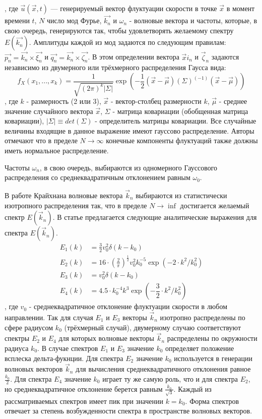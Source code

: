 \noindent
, где $\vec{u} (\vec{x}, t)$ — генерируемый вектор флуктуации скорости в точке $\vec{x}$ в момент времени $t$, $N$ число мод Фурье, $\vec{k_n}$ и $\omega_n$ - волновые вектора и частоты, которые, в свою очередь, генерируются так, чтобы удовлетворять желаемому спектру $E(\vec{k_n})$. Амплитуды каждой из мод задаются по следующим правилам: $\vec{p_n} = \vec{k_n} \times \vec{\xi_n}$ и $\vec{q_n} = \vec{k_n} \times \vec{\zeta_n}$. В этом определении вектора $\vec xi_n$ и $\vec \zeta_n$ задаются независимо из двумерного или трёхмерного распределения Гаусса вида:  
\begin{equation}
  \label{eq:gauss_distr1}
  f_X (x_1, ..., x_k) = \frac{1}{\sqrt{(2 \pi)^k \left|\Sigma\right|}} \exp{(- \frac{1}{2} (\vec{x} - \vec{\mu}) (\Sigma)^(-1) (\vec{x} - \vec{\mu}) )} 
\end{equation}
\noindent
, где $k$ - размерность (2 или 3), $\vec x$ - вектор-столбец размерности $k$, $\vec \mu$ - среднее значение случайного вектора $\vec x$, $\Sigma$ - матрица ковариации (обобщенная матрица ковариации), $\left| \Sigma \right| \equiv det(\Sigma)$ - определитель матрицы ковариации. Все случайные величины входящие в данное выражение имеют гауссово распределение. Авторы отмечают что в пределе $N \rightarrow \infty$ конечные компоненты флуктуаций также должны иметь нормальное распределение.

Частоты $\omega_n$, в свою очередь, выбираются из одномерного Гауссового распределения со среднеквадратичным отклонением равным $\omega_0$. 

В работе Крайхнана волновые вектора $\vec k_n$ выбираются из статистически изотропного распределения так, что в пределе $N \rightarrow \inf$ достигается желаемый спектр $E(\vec k_n)$. В статье предлагается следующие аналитические выражения для спектра $E(\vec k_n)$.
\begin{align}
  \label{eq:spectral_equation2}
  E_1(k) & = \frac{3}{2} v_0^2 \delta(k-k_0) \nonumber \\
  E_2(k) & = 16 \cdot (\frac{2}{\pi})^{\frac{1}{2}} v_0^2 k_0^{-5} \exp{(- 2 \cdot k^2 / k_0^2)} \nonumber \\
  E_3(k) & = v_0^2 \delta(k-k_0) \nonumber \\
  E_4(k) & = 4.5 \cdot k_0^{-4} k^3 \exp{(- \dfrac{3}{2} \cdot k^2 / k_0^2)}
\end{align}
\noindent
, где $v_0$ - среднеквадратичное отклонение флуктуации скорости в любом направлении. Так для случая $E_1$ и $E_3$ векторы $\vec k_n$ изотропно распределены по сфере радиусом $k_0$ (трёхмерный случай), двумерному случаю соответствуют спектры $E_2$ и $E_4$ для которых волновые векторы $\vec k_n$ распределены по окружности радиуса $k_0$. В случае спектров $E_1$ и $E_3$ значение $k_0$ определяет положение всплеска дельта-фукнции. Для спектра $E_2$ значение $k_0$ используется в генерации волновых векторов $\vec k_n$ для вычисления среднеквадратичного отклонения равное $\frac{k_0}{2}$. Для спектра $E_4$ значение $k_0$ играет ту же самую роль, что и для спектра $E_2$, но среднеквадратичное отклонение берется равным $\frac{k_0}{\sqrt{3}}$. Каждый из рассматриваемых спектров имеет пик при значении $k = k_0$. Форма спектров отвечает за степень возбужденности спектра в пространстве волновых векторов.

